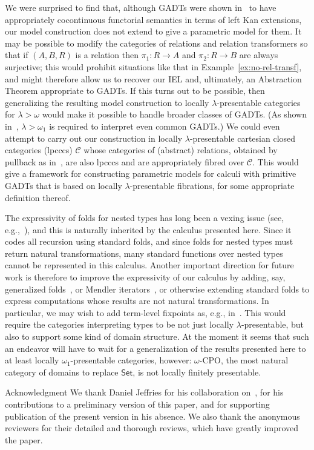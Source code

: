 \documentclass{lmcs}
\theoremstyle{plain}\newtheorem{satz}[thm]{Satz}
\newcommand{\cal}{\mathcal}
\newcommand{\set}{\mathsf{Set}}
\begin{document}
We were surprised to find that, although GADTs were shown
in~\cite{jp19} to have appropriately cocontinuous functorial semantics
in terms of left Kan extensions, our model construction does not
extend to give a parametric model for them. It may be possible to
modify the categories of relations and relation transformers so that
if $(A,B,R)$ is a relation then $\pi_1 : R \to A$ and $\pi_2 : R \to
B$ are always surjective; this would prohibit situations like that in
Example~\ref{ex:no-rel-transf}, and might therefore allow us to
recover our IEL and, ultimately, an Abstraction Theorem appropriate to
GADTs.  If this turns out to be possible, then generalizing the
resulting model construction to locally $\lambda$-presentable
categories for $\lambda > \omega$ would make it possible to handle
broader classes of GADTs. (As shown in~\cite{jp19}, $\lambda >
\omega_1$ is required to interpret even common GADTs.) We could even
attempt to carry out our construction in locally $\lambda$-presentable
cartesian closed categories (lpcccs) $\cal C$ whose categories of
(abstract) relations, obtained by pullback as in~\cite{jac99}, are
also lpcccs and are appropriately fibred over $\cal C$. This would
give a framework for constructing parametric models for calculi with
primitive GADTs that is based on locally $\lambda$-presentable
fibrations, for some appropriate definition thereof.

The expressivity of folds for nested types has long been a vexing
issue (see, e.g.,~\cite{bm98}), and this is naturally inherited by the
calculus presented here. Since it codes all recursion using standard
folds, and since folds for nested types must return natural
transformations, many standard functions over nested types cannot be
represented in this calculus. Another important direction for future
work is therefore to improve the expressivity of our calculus by
adding, say, generalized folds~\cite{bp99}, or Mendler
iterators~\cite{amu05}, or otherwise extending standard folds to
express computations whose results are not natural transformations. In
particular, we may wish to add term-level fixpoints as, e.g.,
in~\cite{pit00}. This would require the categories interpreting types
to be not just locally $\lambda$-presentable, but also to support some
kind of domain structure. At the moment it seems that such an endeavor
will have to wait for a generalization of the results presented here
to at least locally $\omega_1$-presentable categories, however:
$\omega$-CPO, the most natural category of domains to replace $\set$,
is not locally finitely presentable.

\vspace*{0.1in}

\noindent
{\small \sc Acknowledgment} We thank Daniel Jeffries for his
collaboration on~\cite{jgj21}, for his contributions to a preliminary
version of this paper, and for supporting publication of the present
version in his absence. We also thank the anonymous reviewers for
their detailed and thorough reviews, which have greatly improved the
paper.







  
\end{document}
